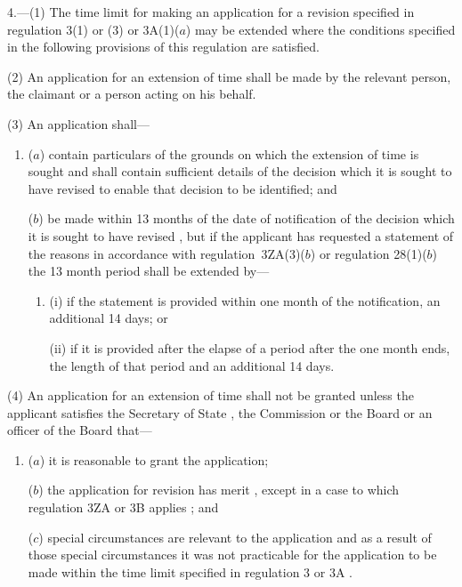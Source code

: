 \documentclass[12pt,a4paper]{article}
\begin{document}
4.—(1) The time limit for making an application for a revision specified in regulation 3(1) or (3) 
or 3A(1)($a$)  %
may be extended where the conditions specified in the following provisions of this regulation are satisfied.

(2) An application for an extension of time shall be made by 
the relevant person,  %
the claimant or a person acting on his behalf.

(3) An application shall—
\begin{enumerate}\item[]
($a$) contain particulars of the grounds on which the extension of time is sought and shall contain sufficient details of the decision which it is sought to have revised to enable that decision to be identified; and

($b$) be made within 13 months of the date of notification of the decision which it is sought to have revised%
, but if the applicant has requested a statement of the reasons in accordance with 
regulation~3ZA(3)($b$)  or  %
regulation 28(1)($b$)  the 13 month period shall be extended by—
\begin{enumerate}\item[]
(i) if the statement is provided within one month of the notification, an additional 14 days; or

(ii) if it is provided after the elapse of a period after the one month ends, the length of that period and an additional 14 days.
\end{enumerate}  %
\end{enumerate}

(4) An application for an extension of time shall not be granted unless the applicant satisfies the Secretary of State%
, the Commission
or the Board or an officer of the Board  %
that—
\begin{enumerate}\item[]
($a$) it is reasonable to grant the application;

($b$) the application for revision has merit%
, except in a case to which regulation 3ZA or 3B applies%
; and

($c$) special circumstances are relevant to the application and as a result of those special circumstances it was not practicable for the application to be made within the time limit specified in regulation 3 
or 3A%
.
\end{enumerate}
\end{document}
